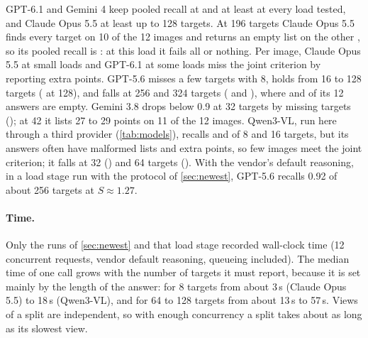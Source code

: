 GPT-6.1 and Gemini 4 keep pooled recall at  and at least  at every load tested, and Claude Opus 5.5 at least  up to 128 targets. At 196 targets Claude Opus 5.5 finds every target on 10 of the 12 images and returns an empty list on the other , so its pooled recall is : at this load it fails all or nothing. Per image, Claude Opus 5.5 at small loads and GPT-6.1 at some loads miss the joint criterion by reporting extra points. GPT-5.6 misses a few targets with 8, holds from 16 to 128 targets ( at 128), and falls at 256 and 324 targets ( and ), where  and  of its 12 answers are empty. Gemini 3.8 drops below 0.9 at 32 targets by missing targets (); at 42 it lists 27 to 29 points on 11 of the 12 images. Qwen3-VL, run here through a third provider (\cref{tab:models}), recalls  and  of 8 and 16 targets, but its answers often have malformed lists and extra points, so few images meet the joint criterion; it falls at 32 () and 64 targets (). With the vendor's default reasoning, in a load stage run with the protocol of \cref{sec:newest}, GPT-5.6 recalls 0.92 of about 256 targets at $S \approx 1.27$.

\paragraph{Time.} Only the runs of \cref{sec:newest} and that load stage recorded wall-clock time (12 concurrent requests, vendor default reasoning, queueing included). The median time of one call grows with the number of targets it must report, because it is set mainly by the length of the answer: for 8 targets from about 3\,s (Claude Opus 5.5) to 18\,s (Qwen3-VL), and for 64 to 128 targets from about 13\,s to 57\,s. Views of a split are independent, so with enough concurrency a split takes about as long as its slowest view.
